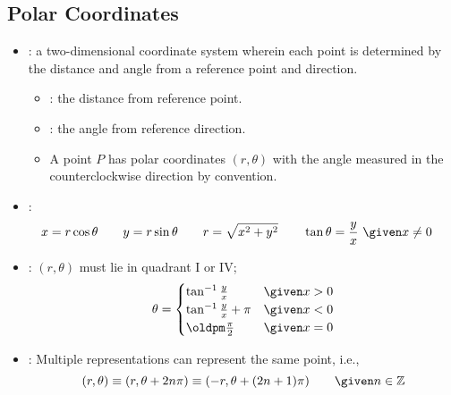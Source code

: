 \subsection{Polar Coordinates}
\begin{itemize}
\item {}: a two-dimensional coordinate system
  wherein each point is determined by the distance and angle from a reference
  point and direction.
  \begin{itemize}
    \item {}: the distance from reference point.
    \item {}: the angle from reference direction.
    \item A point \(P\) has polar coordinates \((r, \theta)\) with the angle
      measured in the counterclockwise direction by convention.
  \end{itemize}

\item {}:
  \begin{align*}
    x &= r \cos \theta \qquad
    y = r \sin \theta \qquad
    r = \sqrt{x^2 + y^2} \qquad
    \tan \theta = \frac{y}{x} ~ \given  x\neq 0
  \end{align*}

\item {}: \((r,\theta)\) must lie in quadrant I or IV;
  \[%
  \theta =
    \begin{cases}
      \tan ^{-1} \frac{y}{x} & \given x > 0 \\
      \tan ^{-1} \frac{y}{x} + \pi & \given x < 0 \\
      \oldpm \frac{\pi}{2} &\given x = 0
    \end{cases}
  \]%

\item {}: Multiple representations can represent the same point, i.e.,
  \[%
    (r, \theta) \equiv (r, \theta + 2 n \pi) \equiv (-r, \theta + (2n +1)\pi) \qquad \given n \in \mathbb{Z}
  \]%


\end{itemize}
